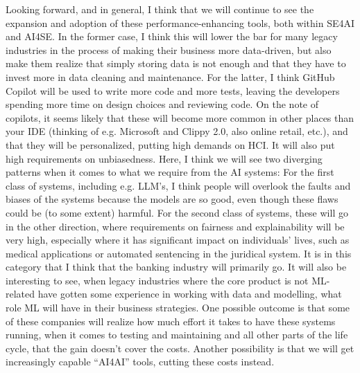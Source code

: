 \documentclass[11pt]{article}
\begin{document}
Looking forward, and in general, I think that we will continue to see the expansion and adoption of these performance-enhancing tools, both within SE4AI and AI4SE. In the former case, I think this will lower the bar for many legacy industries in the process of making their business more data-driven, but also make them realize that simply storing data is not enough and that they have to invest more in data cleaning and maintenance. For the latter, I think GitHub Copilot will be used to write more code and more tests, leaving the developers spending more time on design choices and reviewing code. On the note of copilots, it seems likely that these will become more common in other places than your IDE (thinking of e.g. Microsoft and Clippy 2.0, also online retail, etc.), and that they will be personalized, putting high demands on HCI. It will also put high requirements on unbiasedness. Here, I think we will see two diverging patterns when it comes to what we require from the AI systems: For the first class of systems, including e.g. LLM's, I think people will overlook the faults and biases of the systems because the models are so good, even though these flaws could be (to some extent) harmful. For the second class of systems, these will go in the other direction, where requirements on fairness and explainability will be very high, especially where it has significant impact on individuals' lives, such as medical applications or automated sentencing in the juridical system. It is in this category that I think that the banking industry will primarily go. It will also be interesting to see, when legacy industries where the core product is not ML-related have gotten some experience in working with data and modelling, what role ML will have in their business strategies. One possible outcome is that some of these companies will realize how much effort it takes to have these systems running, when it comes to testing and maintaining and all other parts of the life cycle, that the gain doesn't cover the costs. Another possibility is that we will get increasingly capable ``AI4AI'' tools, cutting these costs instead.




\end{document}
